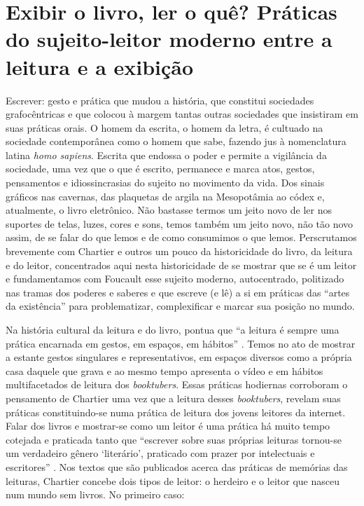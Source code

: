 \section{Exibir o livro, ler o quê? Práticas do sujeito-leitor moderno entre a leitura e a exibição}\label{sec-exibirolivro}

Escrever: gesto e prática que mudou a história, que constitui sociedades
grafocêntricas e que colocou à margem tantas outras sociedades que
insistiram em suas práticas orais. O homem da escrita, o homem da letra,
é cultuado na sociedade contemporânea como o homem que sabe, fazendo jus
à nomenclatura latina \textit{homo sapiens}. Escrita que endossa o poder e
permite a vigilância da sociedade, uma vez que o que é escrito,
permanece e marca atos, gestos, pensamentos e idiossincrasias do sujeito
no movimento da vida. Dos sinais gráficos nas cavernas, das plaquetas de
argila na Mesopotâmia ao códex e, atualmente, o livro eletrônico. Não
bastasse termos um jeito novo de ler nos suportes de telas, luzes, cores
e sons, temos também um jeito novo, não tão novo assim, de se falar do
que lemos e de como consumimos o que lemos. Perscrutamos brevemente com
Chartier e outros um pouco da historicidade do livro, da leitura e do
leitor, concentrados aqui nesta historicidade de se mostrar que se é um
leitor e fundamentamos com Foucault esse sujeito moderno, autocentrado,
politizado nas tramas dos poderes e saberes e que escreve (e lê) a si em
práticas das \enquote{artes da existência} para problematizar, complexificar e
marcar sua posição no mundo.

Na história cultural da leitura e do livro, \textcite{chartier1999ordem} pontua que \enquote{a leitura é sempre uma prática encarnada em gestos, em espaços, em
hábitos} \cite[p. 13]{chartier1999ordem}. Temos no ato de mostrar a estante gestos singulares e representativos, em espaços diversos como a própria casa
daquele que grava e ao mesmo tempo apresenta o vídeo e em hábitos
multifacetados de leitura dos \textit{booktubers}. Essas práticas
hodiernas corroboram o pensamento de Chartier uma vez que a leitura
desses \textit{booktubers}, revelam suas práticas constituindo-se numa
prática de leitura dos jovens leitores da internet. Falar dos livros e
mostrar-se como um leitor é uma prática há muito tempo cotejada e
praticada tanto que \enquote{escrever sobre suas próprias leituras tornou-se um
verdadeiro gênero \enquote*{literário}, praticado com prazer por intelectuais e
escritores} \citeyear[p. 7]{chartier2019lersem}. Nos textos que são publicados
acerca das práticas de memórias das leituras, Chartier concebe dois
tipos de leitor: o herdeiro e o leitor que nasceu num mundo sem livros.
No primeiro caso:

